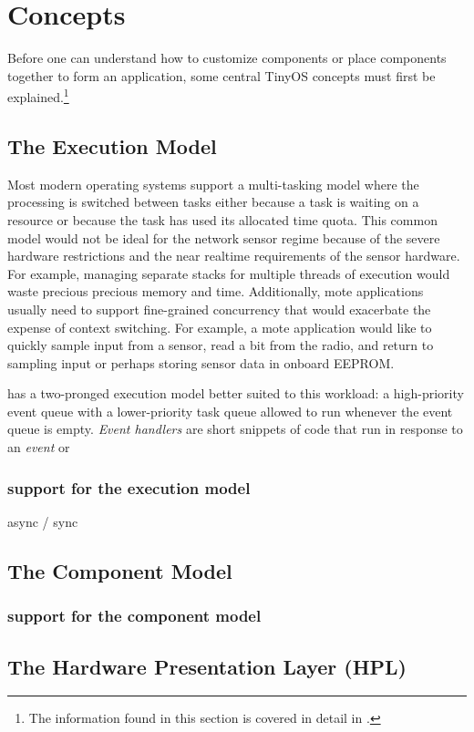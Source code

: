 \section{\tinyos Concepts}

Before one can understand how to customize components or place 
components together to form an application, some central TinyOS concepts  
must first be explained.\footnote{The 
information found in this section is covered in detail in \cite{jhill-thesis}.} 

\subsection{The Execution Model}

Most modern operating systems support a multi-tasking model where the
processing is switched between tasks either because a task is waiting 
on a resource or because the task has used its allocated time quota. This
common model would not be ideal for the network sensor regime because
of the severe hardware restrictions and the near realtime requirements
of the sensor hardware. For example, managing separate stacks for
multiple threads of execution would waste precious precious memory and
time. Additionally, mote applications usually need to support fine-grained
concurrency that would exacerbate the expense of context switching. For
example, a mote application would like to quickly sample input from a
sensor, read a bit from the radio, and return to sampling input or
perhaps storing sensor data in onboard EEPROM.

\tinyos has a two-pronged execution model better suited to this 
workload: a high-priority event queue with a lower-priority task queue
allowed to run whenever the event queue is empty. \emph{Event handlers} 
are short snippets of code that run in response to an \emph{event} or 

\subsubsection{\nesc support for the execution model}

async / sync

\subsection{The Component Model}

\subsubsection{\nesc support for the component model}

\subsection{The Hardware Presentation Layer (HPL)}


